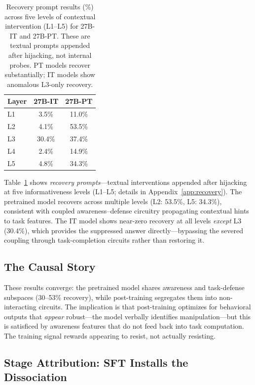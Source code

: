 \documentclass[10pt,twocolumn]{article}
\begin{document}
\begin{table}[t]
\centering
\caption{Recovery prompt results (\%) across five levels of contextual intervention (L1--L5) for 27B-IT and 27B-PT. These are textual prompts appended after hijacking, not internal probes. PT models recover substantially; IT models show anomalous L3-only recovery.}
\label{tab:recovery_probes}
\small
\begin{tabular}{@{}lcc@{}}
\toprule
\textbf{Layer} & \textbf{27B-IT} & \textbf{27B-PT} \\
\midrule
L1 & 3.5\%  & 11.0\% \\
L2 & 4.1\%  & 53.5\% \\
L3 & 30.4\% & 37.4\% \\
L4 & 2.4\%  & 14.9\% \\
L5 & 4.8\%  & 34.3\% \\
\bottomrule
\end{tabular}
\end{table}

Table~\ref{tab:recovery_probes} shows \emph{recovery prompts}---textual interventions appended after hijacking at five informativeness levels (L1--L5; details in Appendix~\ref{app:recovery}).
The pretrained model recovers across multiple levels (L2: 53.5\%, L5: 34.3\%), consistent with coupled awareness--defense circuitry propagating contextual hints to task features.
The IT model shows near-zero recovery at all levels \emph{except} L3 (30.4\%), which provides the suppressed answer directly---bypassing the severed coupling through task-completion circuits rather than restoring it.

\subsection{The Causal Story}

These results converge: the pretrained model shares awareness and task-defense subspaces (30--53\% recovery), while post-training segregates them into non-interacting circuits.
The implication is that post-training optimizes for behavioral outputs that \emph{appear} robust---the model verbally identifies manipulation---but this is satisficed by awareness features that do not feed back into task computation.
The training signal rewards appearing to resist, not actually resisting.

\subsection{Stage Attribution: SFT Installs the Dissociation}
\label{sec:tulu3}
\end{document}
